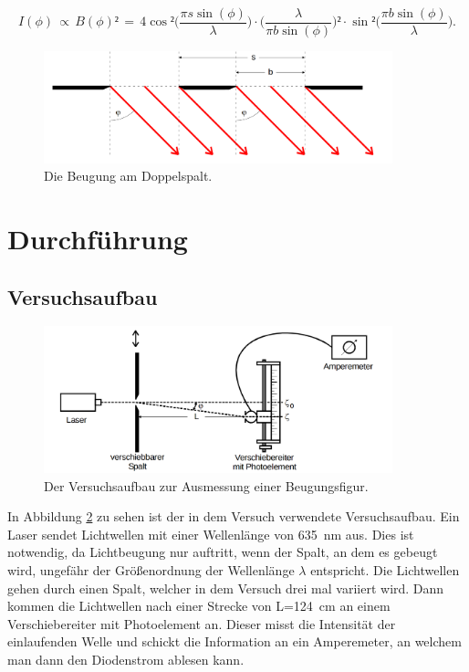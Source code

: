 \documentclass[
  bibliography=totoc,     %
  captions=tableheading,  %
  titlepage=firstiscover, %
]{scrartcl}
\begin{document}
\begin{equation}
  I(\phi)\,\propto\,B(\phi)²\,=\,4\cos²\Big(\frac{\pi s\sin(\phi)}{\lambda}\Big)\cdot\Big(\frac{\lambda}{\pi b\sin(\phi)}\Big)²\cdot \sin²\Big(\frac{\pi b\sin(\phi)}{\lambda}\Big).
  \label{eqn:intensitätsverteilungdoppel}
\end{equation}
\begin{figure}[htb]
  \centering
  \includegraphics[width=0.9\textwidth]{V4064.png}
  \caption{Die Beugung am Doppelspalt. \cite{anleitung}}
  \label{fig:V4064}
\end{figure}

\section{Durchführung}
\subsection{Versuchsaufbau}
\label{sec:Versuchsaufbau}
\begin{figure}[htb]
  \centering
  \includegraphics[width=0.9\textwidth]{V4063.png}
  \caption{Der Versuchsaufbau zur Ausmessung einer Beugungsfigur. \cite{anleitung}}
  \label{fig:V4063}
\end{figure}
In Abbildung \ref{fig:V4063} zu sehen ist der in dem Versuch verwendete Versuchsaufbau. Ein Laser sendet Lichtwellen mit einer Wellenlänge von \SI{635}{\nano\metre} aus. Dies ist notwendig, da Lichtbeugung nur auftritt, wenn der Spalt, an dem es gebeugt wird, ungefähr der Größenordnung der Wellenlänge $\lambda$ entspricht. Die Lichtwellen gehen durch einen Spalt, welcher in dem Versuch drei mal variiert wird. Dann kommen die Lichtwellen nach einer Strecke von L=\SI{124}{\centi\metre} an einem Verschiebereiter mit Photoelement an. Dieser misst die Intensität der einlaufenden Welle und schickt die Information an ein Amperemeter, an welchem man dann den Diodenstrom ablesen kann.
\end{document}
